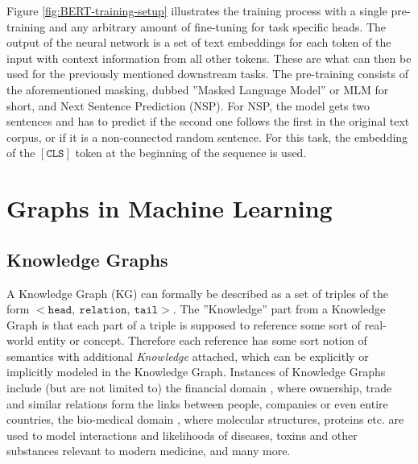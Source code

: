 \documentclass[draft,final]{vutinfth} %
\begin{document}
Figure \ref{fig:BERT-training-setup} illustrates the training process with a single pre-training and any arbitrary amount of fine-tuning for task specific heads. The output of the neural network is a set of text embeddings for each token of the input with context information from all other tokens. These are what can then be used for the previously mentioned downstream tasks. The pre-training consists of the aforementioned masking, dubbed ''Masked Language Model'' or MLM for short, and Next Sentence Prediction (NSP). For NSP, the model gets two sentences and has to predict if the second one follows the first in the original text corpus, or if it is a non-connected random sentence. For this task, the embedding of the $\mathtt{[CLS]}$ token at the beginning of the sequence is used. \cite{BERT}

\chapter{Graphs in Machine Learning}
\section{Knowledge Graphs}
A Knowledge Graph (KG) can formally be described as a set of triples of the form 
$\mathtt{< head,\ relation,\ tail>}$. The ''Knowledge'' part from a Knowledge Graph is that each part of a triple is supposed to reference some sort of real-world entity or concept. Therefore each reference has some sort notion of semantics with additional \textit{Knowledge} attached, which can be explicitly or implicitly modeled in the Knowledge Graph. Instances of Knowledge Graphs include (but are not limited to) the financial domain \cite{Bellomarini_Magnanimi_Nissl_Sallinger_2021}, where ownership, trade and similar relations form the links between people, companies or even entire countries, the bio-medical domain \cite{Lu_Goi_Zhao_Wang_2025}, where molecular structures, proteins etc. are used to model interactions and likelihoods of diseases, toxins and other substances relevant to modern medicine, and many more.
\end{document}
